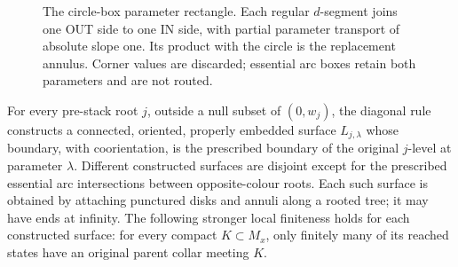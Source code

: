 \begin{figure}[htbp]
\centering
{}
\caption{The circle-box parameter rectangle.  Each regular $d$-segment
joins one OUT side to one IN side, with partial parameter transport of
absolute slope one.  Its product with the circle is the replacement
annulus.  Corner values are discarded; essential arc boxes retain both
parameters and are not routed.}
\label{wl:routing-figure}
\end{figure}


\begin{proposition}
\label{wl:routing}
For every pre-stack root $j$, outside a null subset of $(0,w_j)$, the diagonal
rule constructs a connected, oriented, properly embedded surface
$L_{j,\lambda}$ whose boundary, with coorientation, is the prescribed boundary
of the original $j$-level at parameter $\lambda$.  Different constructed
surfaces are disjoint except for the prescribed essential arc intersections
between opposite-colour roots.  Each such surface is obtained by attaching
punctured disks and annuli along a rooted tree; it may have ends at infinity.
The following stronger local finiteness holds for each constructed surface:
for every compact $K\subset M_x$, only finitely many of its reached states
have an original parent collar meeting $K$.
\end{proposition}

